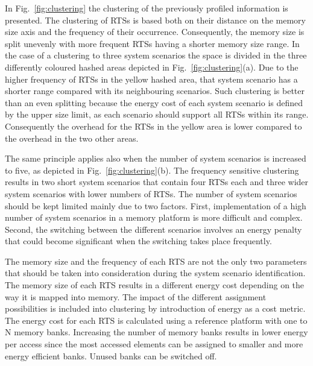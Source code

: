 \documentclass[smallextended]{svjour3}
\begin{document}
In Fig.~\ref{fig:clustering} the clustering of the previously profiled information is presented. 
The clustering of RTSs is based both on their distance on the memory size axis and the frequency of their occurrence. 
Consequently, the memory size is split unevenly with more frequent RTSs having a shorter memory size range. 
In the case of a clustering to three system scenarios the space is divided in the three differently coloured hashed areas depicted in Fig.~\ref{fig:clustering}(a). 
Due to the higher frequency of RTSs in the yellow hashed area, that system scenario has a shorter range compared with its neighbouring scenarios. 
Such clustering is better than an even splitting because the energy cost of each system scenario is defined by the upper size limit, as each scenario should support all RTSs within its range. 
Consequently the overhead for the RTSs in the yellow area is lower compared to the overhead in the two other areas.

The same principle applies also when the number of system scenarios is increased to five, as depicted in Fig.~\ref{fig:clustering}(b). 
The frequency sensitive clustering results in two short system scenarios that contain four RTSs each and three wider system scenarios with lower numbers of RTSs. 
The number of system scenarios should be kept limited mainly due to two factors. 
First, implementation of a high number of system scenarios in a memory platform is more difficult and complex. 
Second, the switching between the different scenarios involves an energy penalty that could become significant when the switching takes place frequently.

The memory size and the frequency of each RTS are not the only two parameters that should be taken into consideration during the system scenario identification. 
The memory size of each RTS results in a different energy cost depending on the way it is mapped into memory. 
The impact of the different assignment possibilities is included into clustering by introduction of energy as a cost metric. 
The energy cost for each RTS is calculated using a reference platform with one to N
memory banks. 
Increasing the number of memory banks results in lower energy per access since the most accessed elements can be assigned to smaller and more energy efficient banks. Unused banks can be switched off.
\end{document}
